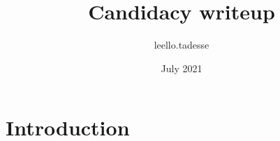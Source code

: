 \documentclass{article}
\title{Candidacy writeup}
\author{leello.tadesse }
\date{July 2021}
\begin{document}
\maketitle

\section{Introduction}
\end{document}
